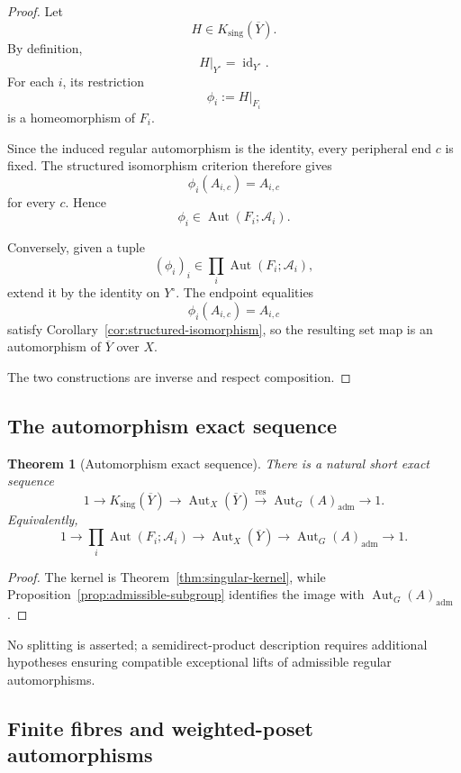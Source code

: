 \documentclass[11pt]{article}
\theoremstyle{plain}
\newtheorem{theorem}{Theorem}[section]
\theoremstyle{definition}
\begin{document}
\begin{proof}
Let
\[
H\in K_{\mathrm{sing}}(\overline Y).
\]
By definition,
\[
H|_{Y^\circ}
=
\operatorname{id}_{Y^\circ}.
\]
For each $i$, its restriction
\[
\phi_i:=H|_{F_i}
\]
is a homeomorphism of $F_i$.

Since the induced regular automorphism is the identity, every peripheral
end $c$ is fixed.  The structured isomorphism criterion therefore gives
\[
\phi_i(A_{i,c})=A_{i,c}
\]
for every $c$.  Hence
\[
\phi_i\in\operatorname{Aut}(F_i;\mathcal A_i).
\]

Conversely, given a tuple
\[
(\phi_i)_i
\in
\prod_i\operatorname{Aut}(F_i;\mathcal A_i),
\]
extend it by the identity on $Y^\circ$.  The endpoint equalities
\[
\phi_i(A_{i,c})=A_{i,c}
\]
satisfy Corollary~\ref{cor:structured-isomorphism}, so the resulting set map is an
automorphism of $\overline Y$ over $X$.

The two constructions are inverse and respect composition.
\end{proof}

\subsection{The automorphism exact sequence}
\label{subsec:automorphism-exact-sequence}

\begin{theorem}[Automorphism exact sequence]
\label{thm:completed-aut-exact}
There is a natural short exact sequence
\[
1
\longrightarrow
K_{\mathrm{sing}}(\overline Y)
\longrightarrow
\operatorname{Aut}_X(\overline Y)
\overset{\operatorname{res}}{\longrightarrow}
\operatorname{Aut}_G(A)_{\mathrm{adm}}
\longrightarrow
1.
\]
Equivalently,
\[
1
\longrightarrow
\prod_i
\operatorname{Aut}(F_i;\mathcal A_i)
\longrightarrow
\operatorname{Aut}_X(\overline Y)
\longrightarrow
\operatorname{Aut}_G(A)_{\mathrm{adm}}
\longrightarrow
1.
\]
\end{theorem}

\begin{proof}
The kernel is
Theorem~\ref{thm:singular-kernel}, while
Proposition~\ref{prop:admissible-subgroup} identifies the image with
$\operatorname{Aut}_G(A)_{\mathrm{adm}}$.
\end{proof}

No splitting is asserted; a semidirect-product description requires additional
hypotheses ensuring compatible exceptional lifts of admissible regular
automorphisms.

\subsection{Finite fibres and weighted-poset automorphisms}
\label{subsec:finite-kernel-posets}
\end{document}
